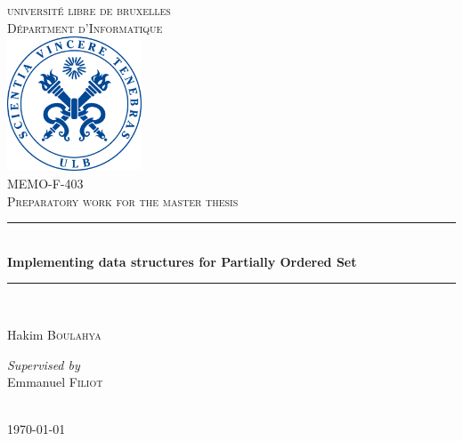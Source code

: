 \documentclass[letterpaper]{article}
\theoremstyle{definition}
\newcommand{\HRule}{\rule{\linewidth}{0.2mm}} %
\begin{document}
\begin{titlepage}

\begin{center}


\textsc{\LARGE universit\'e libre de bruxelles}\\[1.0cm]
\textsc{\Large D\'epartment d'Informatique}\\[1.0cm]

\includegraphics[width=0.3\textwidth]{images/ulblogo.jpg}~\\[1cm]

\textsc{
\large MEMO-F-403 \\
\Large  Preparatory work for the master thesis
 \\[1.0cm]}
\HRule \\[0.3cm]

{ \huge \bfseries Implementing data structures for
Partially Ordered Set \\[0.3cm] }

\HRule \\[1cm]

\noindent
\begin{center} \large

\Large Hakim \textsc{Boulahya}\\
\end{center}
\begin{center} \large

\emph{Supervised by} \\
\Large Emmanuel \textsc{Filiot} \\

\end{center}

\\[1cm]
{\large \today}

\end{center}
\end{titlepage}
\end{document}
